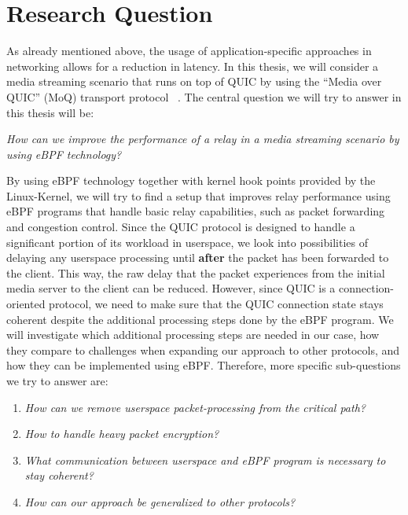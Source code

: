 \section{Research Question}\label{sec:research_question}

As already mentioned above, the usage of application-specific approaches in networking allows for a reduction in latency.
In this thesis, we will consider a media streaming scenario that runs on top of QUIC by using the ``Media over QUIC'' (MoQ) transport protocol
~\parencite{draft-moqtransport}.
The central question we will try to answer in this thesis will be:
\vspace{0.5cm}
\begin{center}
    \textit{How can we improve the performance of a relay in a media streaming scenario by using eBPF technology?}
\end{center}
\vspace{0.5cm}
By using eBPF technology together with kernel hook points provided by the Linux-Kernel, we will try to find a setup that improves relay 
performance using eBPF programs that handle basic relay capabilities, such as packet forwarding and congestion control.
Since the QUIC protocol is designed to handle a significant portion of its workload in userspace, we look into possibilities of delaying any 
userspace processing until \textbf{after} the packet has been forwarded to the client.
This way, the raw delay that the packet experiences from the initial media server to the client can be reduced. 
However, since QUIC is a connection-oriented protocol, we need to make sure that the QUIC connection state stays 
coherent despite the additional processing steps done by the eBPF program.
We will investigate which additional processing steps are needed in our case, how they compare to challenges when expanding our approach to other protocols, 
and how they can be implemented using eBPF\@.
Therefore, more specific sub-questions we try to answer are:
\vspace{0.5cm}
\begin{enumerate}
    \item \textit{How can we remove userspace packet-processing from the critical path?}
    \item \textit{How to handle heavy packet encryption?}
    \item \textit{What communication between userspace and eBPF program is necessary to stay coherent?}
    \item \textit{How can our approach be generalized to other protocols?}
\end{enumerate}
\vspace{0.5cm}